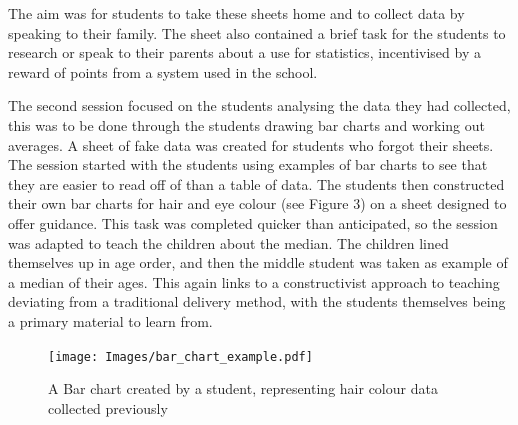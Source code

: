 \documentclass[11pt, a4paper, notitlepage]{article}
\begin{document}
The aim was for students to take these sheets home and to collect data by speaking to their family. The sheet also contained a brief task for the students to research or speak to their parents about a use for statistics, incentivised by a reward of points from a system used in the school.
\par
\vspace{1em}
The second session focused on the students analysing the data they had collected, this was to be done through the students drawing bar charts and working out averages. A sheet of fake data was created for students who forgot their sheets. The session started with the students using examples of bar charts to see that they are easier to read off of than a table of data. The students then constructed their own bar charts for hair and eye colour (see Figure 3) on a sheet designed to offer guidance. This task was completed quicker than anticipated, so the session was adapted to teach the children about the median. The children lined themselves up in age order, and then the middle student was taken as example of a median of their ages. This again links to a constructivist approach to teaching deviating from a traditional delivery method, with the students themselves being a primary material to learn from.

\begin{figure}[htbp]
    \centering
    \texttt{[image: Images/bar\_chart\_example.pdf]}
    \caption{A Bar chart created by a student, representing hair colour data collected previously}
\end{figure}
\end{document}
